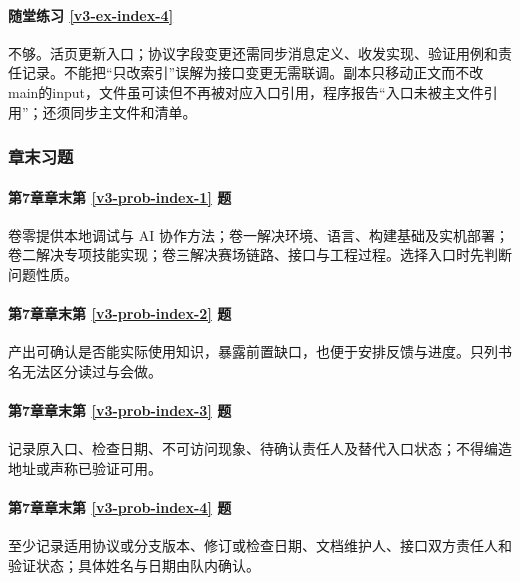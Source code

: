 \paragraph*{随堂练习 \ref{v3-ex-index-4}}
\begin{solution}
不够。活页更新入口；协议字段变更还需同步消息定义、收发实现、验证用例和责任记录。不能把“只改索引”误解为接口变更无需联调。副本只移动正文而不改main的input，文件虽可读但不再被对应入口引用，程序报告“入口未被主文件引用”；还须同步主文件和清单。
\end{solution}

\subsubsection*{章末习题}
\paragraph*{第7章章末第 \ref{v3-prob-index-1} 题}
\begin{solution}
卷零提供本地调试与 AI 协作方法；卷一解决环境、语言、构建基础及实机部署；卷二解决专项技能实现；卷三解决赛场链路、接口与工程过程。选择入口时先判断问题性质。
\end{solution}

\paragraph*{第7章章末第 \ref{v3-prob-index-2} 题}
\begin{solution}
产出可确认是否能实际使用知识，暴露前置缺口，也便于安排反馈与进度。只列书名无法区分读过与会做。
\end{solution}

\paragraph*{第7章章末第 \ref{v3-prob-index-3} 题}
\begin{solution}
记录原入口、检查日期、不可访问现象、待确认责任人及替代入口状态；不得编造地址或声称已验证可用。
\end{solution}

\paragraph*{第7章章末第 \ref{v3-prob-index-4} 题}
\begin{solution}
至少记录适用协议或分支版本、修订或检查日期、文档维护人、接口双方责任人和验证状态；具体姓名与日期由队内确认。
\end{solution}

